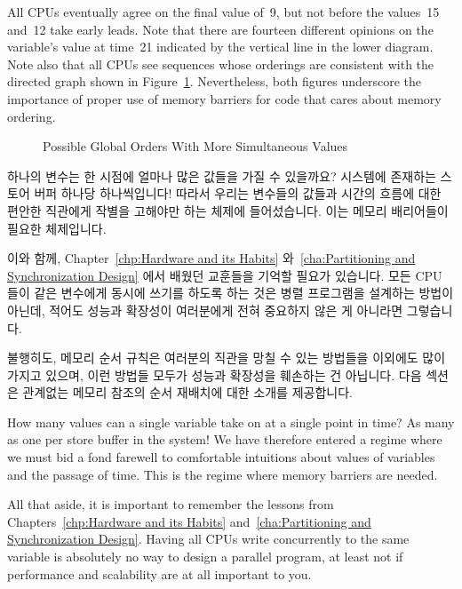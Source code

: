 All CPUs eventually agree on the final value of~9, but not before
the values~15 and~12 take early leads.
Note that there are fourteen different opinions on the variable's value
at time~21 indicated by the vertical line in the lower diagram.
Note also that all CPUs see sequences whose orderings are consistent with
the directed graph shown in
Figure~\ref{fig:memorder:Possible Global Orders With More Simultaneous Values}.
Nevertheless, both figures underscore the importance of
proper use of memory barriers for code that cares about memory ordering.
\fi

\begin{figure}[htb]
\centering
{}
\caption{Possible Global Orders With More Simultaneous Values}
\label{fig:memorder:Possible Global Orders With More Simultaneous Values}
\end{figure}

하나의 변수는 한 시점에 얼마나 많은 값들을 가질 수 있을까요?
시스템에 존재하는 스토어 버퍼 하나당 하나씩입니다!
따라서 우리는 변수들의 값들과 시간의 흐름에 대한 편안한 직관에게 작별을
고해야만 하는 체제에 들어섰습니다.
이는 메모리 배리어들이 필요한 체제입니다.

이와 함께,
Chapter~\ref{chp:Hardware and its Habits}
와~\ref{cha:Partitioning and Synchronization Design} 에서 배웠던 교훈들을
기억할 필요가 있습니다.
모든 CPU 들이 같은 변수에게 동시에 쓰기를 하도록 하는 것은 병렬 프로그램을
설계하는 방법이 아닌데, 적어도 성능과 확장성이 여러분에게 전혀 중요하지 않은 게
아니라면 그렇습니다.

불행히도, 메모리 순서 규칙은 여러분의 직관을 망칠 수 있는 방법들을 이외에도
많이 가지고 있으며, 이런 방법들 모두가 성능과 확장성을 훼손하는 건 아닙니다.
다음 섹션은 관계없는 메모리 참조의 순서 재배치에 대한 소개를 제공합니다.
\iffalse

How many values can a single variable take on at a single point in
time?
As many as one per store buffer in the system!
We have therefore entered a regime where we must bid a fond farewell to
comfortable intuitions about values of variables and the passage of time.
This is the regime where memory barriers are needed.

All that aside, it is important to remember the lessons from
Chapters~\ref{chp:Hardware and its Habits}
and~\ref{cha:Partitioning and Synchronization Design}.
Having all CPUs write concurrently to the same variable
is absolutely no way to design a parallel program, at least
not if performance and scalability are at all important to you.

